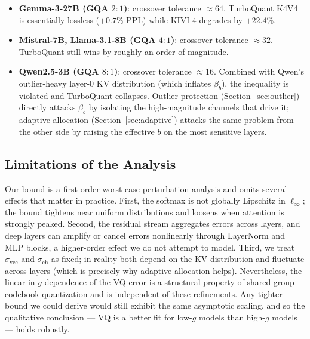 \begin{itemize}
  \item \textbf{Gemma-3-27B (GQA $2{:}1$)}: crossover tolerance $\approx 64$.
  TurboQuant K4V4 is essentially lossless ($+0.7\%$ PPL) while KIVI-4
  degrades by $+22.4\%$.
  \item \textbf{Mistral-7B, Llama-3.1-8B (GQA $4{:}1$)}: crossover tolerance
  $\approx 32$. TurboQuant still wins by roughly an order of magnitude.
  \item \textbf{Qwen2.5-3B (GQA $8{:}1$)}: crossover tolerance $\approx 16$.
  Combined with Qwen's outlier-heavy layer-0 KV distribution (which inflates
  $\beta_b$), the inequality is violated and TurboQuant collapses. Outlier
  protection (Section~\ref{sec:outlier}) directly attacks $\beta_b$ by
  isolating the high-magnitude channels that drive it; adaptive allocation
  (Section~\ref{sec:adaptive}) attacks the same problem from the other side
  by raising the effective $b$ on the most sensitive layers.
\end{itemize}

\subsection{Limitations of the Analysis}
\label{sec:theory-limitations}

Our bound is a first-order worst-case perturbation analysis and omits several
effects that matter in practice. First, the softmax is not globally
Lipschitz in $\ell_\infty$; the bound tightens near uniform distributions and
loosens when attention is strongly peaked. Second, the residual stream
aggregates errors across layers, and deep layers can amplify or cancel errors
nonlinearly through LayerNorm and MLP blocks, a higher-order effect we do not
attempt to model. Third, we treat $\sigma_{\mathrm{vec}}$ and
$\sigma_{\mathrm{ch}}$ as fixed; in reality both depend on the KV
distribution and fluctuate across layers (which is precisely why adaptive
allocation helps). Nevertheless, the linear-in-$g$ dependence of the VQ
error is a structural property of shared-group codebook quantization and is
independent of these refinements. Any tighter bound we could derive would
still exhibit the same asymptotic scaling, and so the qualitative conclusion
--- VQ is a better fit for low-$g$ models than high-$g$ models --- holds
robustly.
